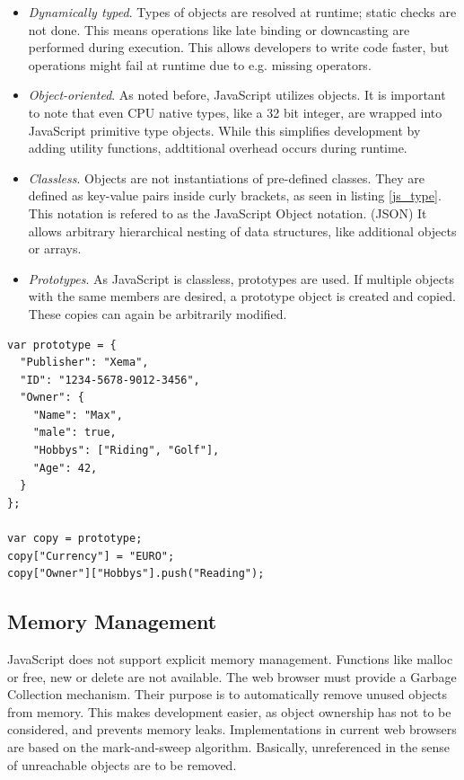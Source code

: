 \begin{itemize}

\item \textit{Dynamically typed}. Types of objects are resolved at runtime; static checks are not done. This means operations like late binding or downcasting are performed during execution. This allows developers to write code faster, but operations might fail at runtime due to e.g. missing operators.

\item \textit{Object-oriented}. As noted before, JavaScript utilizes objects. It is important to note that even CPU native types, like a 32 bit integer, are wrapped into JavaScript primitive type objects. While this simplifies development by adding utility functions, addtitional overhead occurs during runtime.

\item \textit{Classless}. Objects are not instantiations of pre-defined classes. They are defined as key-value pairs inside curly brackets, as seen in listing \ref{js_type}. This notation is refered to as the JavaScript Object notation. (JSON) It allows arbitrary hierarchical nesting of data structures, like additional objects or arrays.

\item \textit{Prototypes}. As JavaScript is classless, prototypes are used. If multiple objects with the same members are desired, a prototype object is created and copied. These copies can again be arbitrarily modified.

\end{itemize}

\begin{lstlisting}[frame=single,basicstyle=\footnotesize]
var prototype = {
  "Publisher": "Xema",
  "ID": "1234-5678-9012-3456",
  "Owner": {
    "Name": "Max",
    "male": true,
    "Hobbys": ["Riding", "Golf"],
    "Age": 42,
  }
};

var copy = prototype;
copy["Currency"] = "EURO";
copy["Owner"]["Hobbys"].push("Reading");
\end{lstlisting}


\subsection{Memory Management}

JavaScript does not support explicit memory management. Functions like malloc or free, new or delete are not available. The web browser must provide a Garbage Collection mechanism. Their purpose is to automatically remove unused objects from memory. This makes development easier, as object ownership has not to be considered, and prevents memory leaks. Implementations in current web browsers are based on the mark-and-sweep algorithm. Basically, unreferenced in the sense of unreachable objects are to be removed. 

